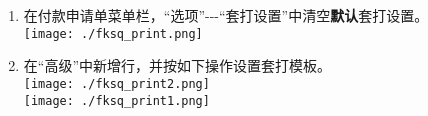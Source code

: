 \documentclass[zihao=-4]{ctexart}
\begin{document}
\begin{enumerate}
\def\labelenumi{\arabic{enumi}.}
\item
  在付款申请单菜单栏，“选项”-\/-\/-“套打设置”中清空\textbf{默认}套打设置。\\
  	\texttt{[image: ./fksq\_print.png]}
\item
  在“高级”中新增行，并按如下操作设置套打模板。\\
  	\texttt{[image: ./fksq\_print2.png]}\\
  	\texttt{[image: ./fksq\_print1.png]}
\end{enumerate}
\end{document}
